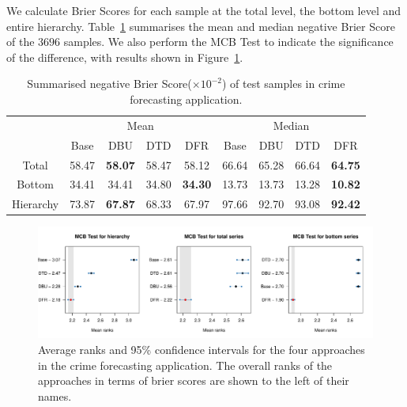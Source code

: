 \documentclass[a4paper,review,12pt,authoryear]{elsarticle}
\begin{document}
     We calculate Brier Scores for each sample at the total level, the bottom level and entire hierarchy. 
     Table~\ref{tab:crime_bs} summarises the mean and median negative Brier Score of the $3696$ samples.
     We also perform the MCB Test to indicate the significance of the difference, with results shown in Figure~\ref{fig:application_crime}.
     
     \begin{table}[h]
       \centering
       \caption{\label{tab:crime_bs}Summarised negative Brier Score($\times 10^{-2}$) of test samples in crime forecasting application.}
       \begin{tabular}{ccccccccc}
       \toprule
       &\multicolumn{4}{c}{Mean} 
       & \multicolumn{4}{c}{Median} \\ \cmidrule(lr){2-5} \cmidrule(lr){6-9}
        & Base & DBU & DTD & DFR &  Base & DBU & DTD & DFR \\\midrule
       Total & 58.47 & \textbf{58.07} & 58.47 & 58.12 & 66.64 & 65.28 & 66.64 & \textbf{64.75} \\
       Bottom & 34.41 & 34.41 & 34.80 & \textbf{34.30} & 13.73 & 13.73 & 13.28 & \textbf{10.82}\\
       Hierarchy & 73.87 & \textbf{67.87} & 68.33 & 67.97 & 97.66 & 92.70 & 93.08 & \textbf{92.42}\\
       \bottomrule
       \end{tabular}
       \end{table}
     
     \begin{figure}[h]
       \caption{\label{fig:application_crime}Average ranks and 95\% confidence intervals for the four approaches in the crime forecasting application. The overall ranks of the approaches in terms of brier scores are shown to the left of their names.}
       \centering
       \includegraphics[width=\textwidth]{figures/dc_crime_mcb.pdf}
     \end{figure}
     
\end{document}
